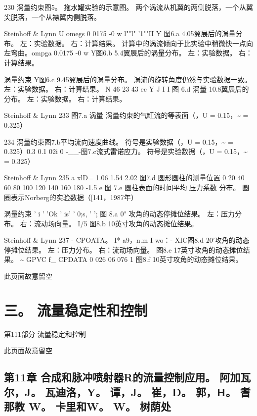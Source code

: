 \documentclass[UTF8,11pt,a4paper,openany,fontset=fandol]{ctexbook}
\begin{document}
230 涡量约束图5。 拖水罐实验的示意图。 两个涡流从机翼的两侧脱落，一个从翼尖脱落，一个从襟翼内侧脱落。

Steinhoff \& Lynn U omegs 0 0175 -0 w l""l" '1""II Y 图6.a 4.05翼展后的涡量分布。 左：实验数据。 右：计算结果。 计算中的涡流倾向于比实验中稍微快一点向左弯曲。ompga 0.0175 -0 w Y图6.b 5.4翼展后的涡量分布。 左：实验数据。 右：计算结果。

涡量约束 Y图6.c 9.45翼展后的涡量分布。 涡流的旋转角度仍然与实验数据一致。 左：实验数据。 右：计算结果。 N 46 23 43 ec Y J I I 图 6.d 涡量 10.8翼展后的分布。 左：实验数据。 右：计算结果。

Steinhoff \& Lynn 233 图7.a 涡量 涡量约束的气缸流的等表面（，U = 0.15，\textasciitilde{} = 0.325）

234 涡量约束图7.b平均流向速度曲线。 符号是实验数据（，U = 0.15，\textasciitilde{} = 0.325）0.3 0.1 02i 0 -\_\_-图7.c流式雷诺应力。 符号是实验数据（，U = 0.15，\textasciitilde{} = 0.325）

Steinhoff \& Lynn 235 a xlD= 1.06 1.54 2.02 图7.d 圆形圆柱的测量位置 0 20 40 60 80 100 120 140 160 180 -1.5 e 图 7.e 圆柱表面的时间平均 压力系数 分布。 圆圈表示Norberg的实验数据（[141，1987年）

涡量约束 ' i ' 'Ok ' is' ' 0;s, ' '; 图 8.a 0" 攻角的动态停摊位结果。 左：压力分布。 右：流动场向量。 I/5 图8.b 10英寸攻角的动态摊位结果。

Steinhoff \& Lynn 237 - CPOATA。 I* a9，n.m I wo：- XIC图8.d 20'攻角的动态停摊位结果。 左：压力分布。 右：流动场向量。 图8.e 17英寸攻角的动态摊位结果。 \textasciitilde{} GPVC f\_ CPDATA 0 026 06 076 1 图8.f 10英寸攻角的动态摊位结果。

此页面故意留空

\clearpage
\part{三。 流量稳定性和控制}
第111部分 流量稳定和控制

此页面故意留空

\clearpage
\chapter{第11章 合成和脉冲喷射器R的流量控制应用。 阿加瓦尔，J。 瓦迪洛，Y。 谭，J。 崔，D。 郭，H。 耆那教 W。 卡里和W。 W。 树荫处}
\end{document}
